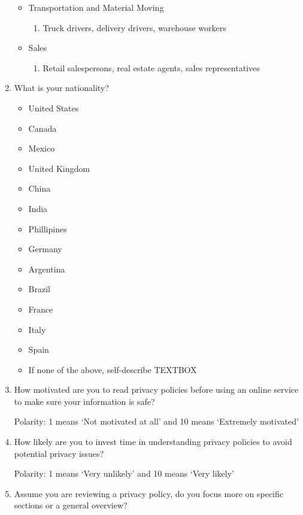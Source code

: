 \begin{enumerate}
\begin{itemize}
        \item Transportation and Material Moving
            \begin{enumerate}
                \item Truck drivers, delivery drivers, warehouse workers
            \end{enumerate}
        \item Sales
            \begin{enumerate}
                \item Retail salespersons, real estate agents, sales representatives
            \end{enumerate}
    \end{itemize}

    \item  What is your nationality?

    \begin{itemize}
        \item United States
        \item Canada
        \item Mexico
        \item United Kingdom
        \item China
        \item India
        \item Phillipines
        \item Germany
        \item Argentina
        \item Brazil
        \item France
        \item Italy
        \item Spain
        \item If none of the above, self-describe TEXTBOX
    \end{itemize}

    \item How motivated are you to read privacy policies before using an online service to make sure your information is safe?	

    Polarity: 1 means ‘Not motivated at all’ and 10 means ‘Extremely motivated’

    \item How likely are you to invest time in understanding privacy policies to avoid potential privacy issues?
        
    Polarity: 1 means ‘Very unlikely’ and 10 means ‘Very likely’

    \item Assume you are reviewing a privacy policy, do you focus more on specific sections or a general overview?


\end{enumerate}
